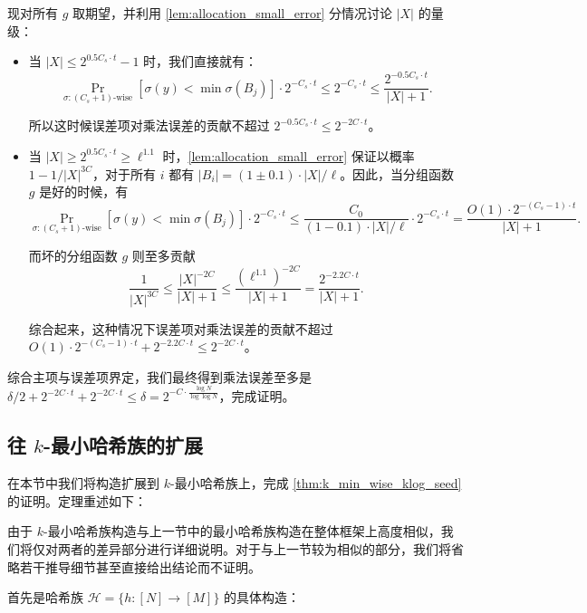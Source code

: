 现对所有 $g$ 取期望，并利用 \cref{lem:allocation_small_error} 分情况讨论 $|X|$ 的量级：
\begin{itemize}
    \item 当 $|X| \le 2^{0.5 C_s \cdot t} - 1$ 时，我们直接就有：
    $$
    \Pr_{\sigma : (C_s + 1)\text{-wise}}[\sigma(y) < \min \sigma(B_j)] \cdot 2^{-C_s \cdot t} \le 2^{-C_s \cdot t} \le \frac{2^{-0.5 C_s \cdot t}}{|X| + 1}.
    $$

    所以这时候误差项对乘法误差的贡献不超过 $2^{-0.5 C_s \cdot t} \le 2^{-2 C \cdot t}$。

    \item 当 $|X| \ge 2^{0.5 C_s \cdot t} \ge \ell^{1.1}$ 时，\cref{lem:allocation_small_error} 保证以概率 $1 - 1 / |X|^{3 C}$，对于所有 $i$ 都有 $|B_i| = (1 \pm 0.1) \cdot |X| / \ell$。因此，当分组函数 $g$ 是好的时候，有
    $$
    \Pr_{\sigma : (C_s + 1)\text{-wise}}[\sigma(y) < \min \sigma(B_j)] \cdot 2^{-C_s \cdot t} \le \frac{C_0}{(1 - 0.1) \cdot |X| / \ell} \cdot 2^{-C_s \cdot t} = \frac{O(1) \cdot 2^{-(C_s - 1) \cdot t}}{|X| + 1}.
    $$

    而坏的分组函数 $g$ 则至多贡献
    $$
    \frac{1}{|X|^{3 C}} \le \frac{|X|^{-2 C}}{|X| + 1} \le \frac{(\ell^{1.1})^{-2 C}}{|X| + 1} = \frac{2^{-2.2 C \cdot t}}{|X| + 1}.
    $$
    
    综合起来，这种情况下误差项对乘法误差的贡献不超过 $O(1) \cdot 2^{-(C_s - 1) \cdot t} + 2^{-2.2 C \cdot t} \le 2^{-2 C \cdot t}$。
\end{itemize}

综合主项与误差项界定，我们最终得到乘法误差至多是 $\delta / 2 + 2^{-2 C \cdot t} + 2^{-2 C \cdot t} \le \delta = 2^{-C \cdot \frac{\log N}{\log \log N}}$，完成证明。

\subsection{往 $k$-最小哈希族的扩展}\label{sec:extending_to_k_minwise}

在本节中我们将构造扩展到 $k$-最小哈希族上，完成 \cref{thm:k_min_wise_klog_seed} 的证明。定理重述如下：

\KMinWiseKLogSeed*

由于 $k$-最小哈希族构造与上一节中的最小哈希族构造在整体框架上高度相似，我们将仅对两者的差异部分进行详细说明。对于与上一节较为相似的部分，我们将省略若干推导细节甚至直接给出结论而不证明。

首先是哈希族 $\mathcal{H} = \{h : [N] \to [M]\}$ 的具体构造：

